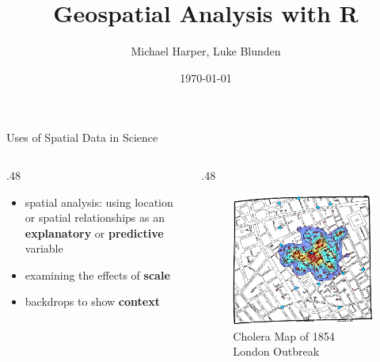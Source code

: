 \documentclass[10pt,ignorenonframetext,]{beamer}
\title{Geospatial Analysis with R}
\author{Michael Harper, Luke Blunden}
\institute{University of Southampton}
\date{\today}
\providecommand{\tightlist}{%
  \setlength{\itemsep}{0pt}\setlength{\parskip}{0pt}}
\def\begincols{\begin{columns}}
\def\begincol{\begin{column}}
\def\endcol{\end{column}}
\def\endcols{\end{columns}}
\begin{document}
\frame{\titlepage}

\begin{frame}{Uses of Spatial Data in Science}

\begincols
\begincol{.48\textwidth}

\begin{itemize}
\tightlist
\item
  spatial analysis: using location or spatial relationships as an
  \textbf{explanatory} or \textbf{predictive} variable
\item
  examining the effects of \textbf{scale}
\item
  backdrops to show \textbf{context}
\end{itemize}

\endcol
\begincol{.48\textwidth}

\begin{figure}

{\centering \includegraphics[width=1\linewidth]{../images/cholera_kernel_density} 

}

\caption{Cholera Map of 1854 London Outbreak}\label{fig:unnamed-chunk-1}
\end{figure}

\endcol
\endcols

\end{frame}
\end{document}
